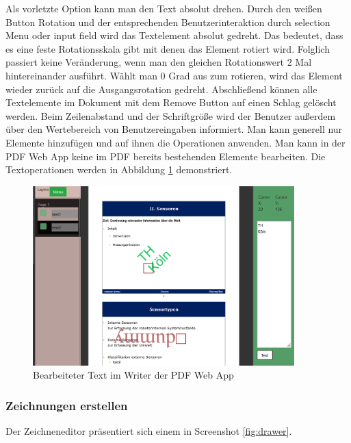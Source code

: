 Als vorletzte Option kann man den Text absolut drehen. Durch den weißen Button Rotation und der entsprechenden Benutzerinteraktion durch selection Menu oder input field wird das Textelement absolut gedreht. Das bedeutet, dass es eine feste Rotationsskala gibt mit denen das Element rotiert wird. Folglich passiert keine Veränderung, wenn man den gleichen Rotationswert 2 Mal hintereinander ausführt. Wählt man 0 Grad aus zum rotieren, wird das Element wieder zurück auf die Ausgangsrotation gedreht. Abschließend können alle Textelemente im Dokument mit dem Remove Button auf einen Schlag gelöscht werden. Beim Zeilenabstand und der Schriftgröße wird der Benutzer außerdem über den Wertebereich von Benutzereingaben informiert. Man kann generell nur Elemente hinzufügen und auf ihnen die Operationen anwenden. Man kann in der PDF Web App keine im PDF bereits bestehenden Elemente bearbeiten. Die Textoperationen werden in Abbildung \ref{fig:text} demonstriert.

\begin{figure}[!htbp]
	\centering
	\includegraphics[width=0.9\textwidth]{"images/text.png"}
	\caption{Bearbeiteter Text im Writer der PDF Web App}
	\label{fig:text}
\end{figure}

\subsubsection{Zeichnungen erstellen}
Der Zeichneneditor präsentiert sich einem in Screenshot \ref{fig:drawer}. 

